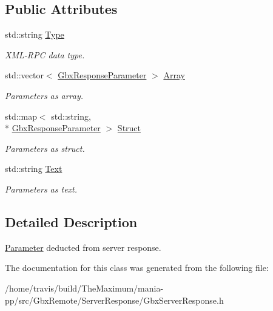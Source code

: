 \subsection*{Public Attributes}
\begin{DoxyCompactItemize}
\item 
\hypertarget{classGbxResponseParameter_aa1700ca65fa2526b112be24b5c0bdbf4}{std\-::string \hyperlink{classGbxResponseParameter_aa1700ca65fa2526b112be24b5c0bdbf4}{Type}}\label{classGbxResponseParameter_aa1700ca65fa2526b112be24b5c0bdbf4}

\begin{DoxyCompactList}\small\item\em X\-M\-L-\/\-R\-P\-C data type. \end{DoxyCompactList}\item 
\hypertarget{classGbxResponseParameter_abd56daae71edf6749b634d0545a85aad}{std\-::vector$<$ \hyperlink{classGbxResponseParameter}{Gbx\-Response\-Parameter} $>$ \hyperlink{classGbxResponseParameter_abd56daae71edf6749b634d0545a85aad}{Array}}\label{classGbxResponseParameter_abd56daae71edf6749b634d0545a85aad}

\begin{DoxyCompactList}\small\item\em Parameters as array. \end{DoxyCompactList}\item 
\hypertarget{classGbxResponseParameter_acc26f8d64983f92709d1fa38b8f33e66}{std\-::map$<$ std\-::string, \\*
\hyperlink{classGbxResponseParameter}{Gbx\-Response\-Parameter} $>$ \hyperlink{classGbxResponseParameter_acc26f8d64983f92709d1fa38b8f33e66}{Struct}}\label{classGbxResponseParameter_acc26f8d64983f92709d1fa38b8f33e66}

\begin{DoxyCompactList}\small\item\em Parameters as struct. \end{DoxyCompactList}\item 
\hypertarget{classGbxResponseParameter_a2e5cb2904900fc74a47c35c0c2fafc55}{std\-::string \hyperlink{classGbxResponseParameter_a2e5cb2904900fc74a47c35c0c2fafc55}{Text}}\label{classGbxResponseParameter_a2e5cb2904900fc74a47c35c0c2fafc55}

\begin{DoxyCompactList}\small\item\em Parameters as text. \end{DoxyCompactList}\end{DoxyCompactItemize}


\subsection{Detailed Description}
\hyperlink{structParameter}{Parameter} deducted from server response. 

The documentation for this class was generated from the following file\-:\begin{DoxyCompactItemize}
\item 
/home/travis/build/\-The\-Maximum/mania-\/pp/src/\-Gbx\-Remote/\-Server\-Response/Gbx\-Server\-Response.\-h\end{DoxyCompactItemize}
